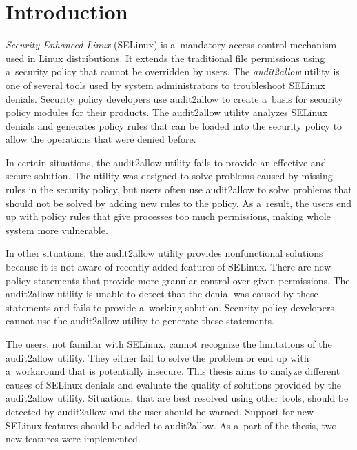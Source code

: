 \chapter{Introduction}

\emph{Security-Enhanced Linux} (SELinux) is a~mandatory access control mechanism
used in Linux distributions. It extends the traditional file permissions using
a~security policy that cannot be overridden by users. The \emph{audit2allow}
utility is one of several tools used by system administrators to troubleshoot
SELinux denials. Security policy developers use audit2allow to create a~basis
for security policy modules for their products. The audit2allow utility analyzes
SELinux denials and generates policy rules that can be loaded into the security
policy to allow the operations that were denied before.

In certain situations, the audit2allow utility fails to provide an effective and
secure solution. The utility was designed to solve problems caused by missing
rules in the security policy, but users often use audit2allow to solve problems
that should not be solved by adding new rules to the policy. As a~result, the
users end up with policy rules that give processes too much permissions, making
whole system more vulnerable.

In other situations, the audit2allow utility provides nonfunctional solutions
because it is not aware of recently added features of SELinux. There are new
policy statements that provide more granular control over given permissions. The
audit2allow utility is unable to detect that the denial was caused by these
statements and fails to provide a~working solution. Security policy developers
cannot use the audit2allow utility to generate these statements.

The users, not familiar with SELinux, cannot recognize the limitations of the
audit2allow utility. They either fail to solve the problem or end up with
a~workaround that is potentially insecure.
This thesis aims to analyze different causes of SELinux denials and evaluate the
quality of solutions provided by the audit2allow utility. Situations, that are
best resolved using other tools, should be detected by audit2allow and the user
should be warned. Support for new SELinux features should be added to
audit2allow. As a~part of the thesis, two new features were implemented.

